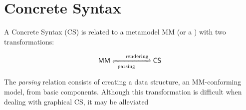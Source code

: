 \section{Concrete Syntax}
\label{sec:CS}

A Concrete Syntax (CS) is related to a metamodel \textsf{MM} (or a \DSML) with 
two transformations:

$$ \mathsf{MM} \xrightleftharpoons[\mathrm{parsing}\phantom{MM}]{\phantom{MM}\mathrm{rendering}} \mathsf{CS}$$

The \emph{parsing} relation consists of creating a data structure, an 
\textsf{MM}-conforming model, from basic components. Although this transformation
is difficult when dealing with graphical CS, it may be alleviated 